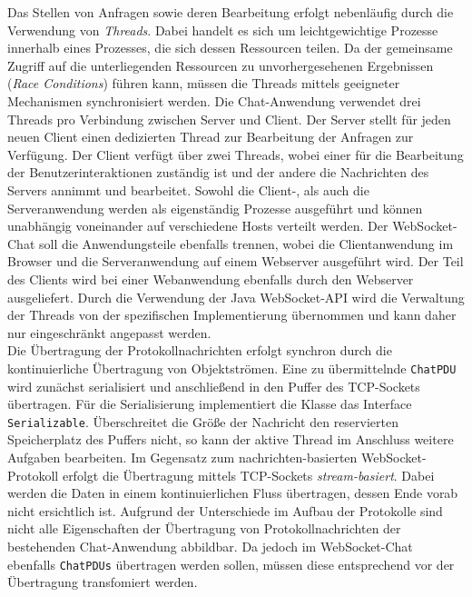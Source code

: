 \documentclass[11pt,a4paper,titlepage]{scrartcl}
\numberwithin{equation}{section}
\begin{document}
\noindent Das Stellen von Anfragen sowie deren Bearbeitung erfolgt nebenläufig durch die Verwendung von \textit{Threads}. Dabei handelt es sich um leichtgewichtige Prozesse innerhalb eines Prozesses, die sich dessen Ressourcen teilen. Da der gemeinsame Zugriff auf die unterliegenden Ressourcen zu unvorhergesehenen Ergebnissen (\textit{Race Conditions}) führen kann, müssen die Threads mittels geeigneter Mechanismen synchronisiert werden. Die Chat-Anwendung verwendet drei Threads pro Verbindung zwischen Server und Client. Der Server stellt für jeden neuen Client einen dedizierten Thread zur Bearbeitung der Anfragen zur Verfügung. Der Client verfügt über zwei Threads, wobei einer für die Bearbeitung der Benutzerinteraktionen zuständig ist und der andere die Nachrichten des Servers annimmt und bearbeitet. Sowohl die Client-, als auch die Serveranwendung werden als eigenständig Prozesse ausgeführt und können unabhängig voneinander auf verschiedene Hosts verteilt werden. Der WebSocket-Chat soll die Anwendungsteile ebenfalls trennen, wobei die Clientanwendung im Browser und die Serveranwendung auf einem Webserver ausgeführt wird. Der Teil des Clients wird bei einer Webanwendung ebenfalls durch den Webserver ausgeliefert. Durch die Verwendung der Java WebSocket-API wird die Verwaltung der Threads von der spezifischen Implementierung übernommen und kann daher nur eingeschränkt angepasst werden. \\

\noindent Die Übertragung der Protokollnachrichten erfolgt synchron durch die kontinuierliche Übertragung von Objektströmen. Eine zu übermittelnde \texttt{ChatPDU} wird zunächst serialisiert und anschließend in den Puffer des TCP-Sockets übertragen. Für die Serialisierung implementiert die Klasse das Interface \texttt{Serializable}. Überschreitet die Größe der Nachricht den reservierten Speicherplatz des Puffers nicht, so kann der aktive Thread im Anschluss weitere Aufgaben bearbeiten. Im Gegensatz zum nachrichten-basierten WebSocket-Protokoll erfolgt die Übertragung mittels TCP-Sockets \textit{stream-basiert}. Dabei werden die Daten in einem kontinuierlichen Fluss übertragen, dessen Ende vorab nicht ersichtlich ist. Aufgrund der Unterschiede im Aufbau der Protokolle sind nicht alle Eigenschaften der Übertragung von Protokollnachrichten der bestehenden Chat-Anwendung abbildbar. Da jedoch im WebSocket-Chat ebenfalls \texttt{ChatPDUs} übertragen werden sollen, müssen diese entsprechend vor der Übertragung transfomiert werden.
\end{document}
